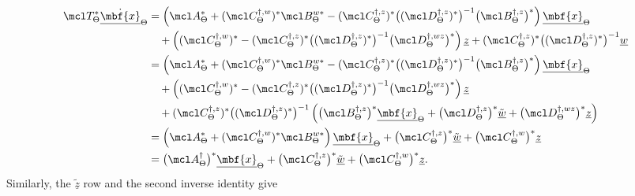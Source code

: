 \begin{align*}
\mcl T_\Theta^*\dot{\underline{\mbf{x}}}_\Theta
&=
\left(
\mcl A_\Theta^*+
(\mcl C_\Theta^{\dagger,w})^*\mcl B_\Theta^{w*}
-
(\mcl C_\Theta^{\dagger,z})^*
\bigl((\mcl D_\Theta^{\dagger,z})^*\bigr)^{-1}
\bigl(\mcl B_\Theta^{\dagger,z}\bigr)^*
\right)\underline{\mbf{x}}_\Theta\\
&\quad+
\left(
(\mcl C_\Theta^{\dagger,w})^*
-
(\mcl C_\Theta^{\dagger,z})^*
\bigl((\mcl D_\Theta^{\dagger,z})^*\bigr)^{-1}
\bigl(\mcl D_\Theta^{\dagger,wz}\bigr)^*
\right)\underline z
+
(\mcl C_\Theta^{\dagger,z})^*
\bigl((\mcl D_\Theta^{\dagger,z})^*\bigr)^{-1}
\underline w\\
&=
\left(
\mcl A_\Theta^*+
(\mcl C_\Theta^{\dagger,w})^*\mcl B_\Theta^{w*}
-
(\mcl C_\Theta^{\dagger,z})^*
\bigl((\mcl D_\Theta^{\dagger,z})^*\bigr)^{-1}
\bigl(\mcl B_\Theta^{\dagger,z}\bigr)^*
\right)\underline{\mbf{x}}_\Theta\\
&\quad+
\left(
(\mcl C_\Theta^{\dagger,w})^*
-
(\mcl C_\Theta^{\dagger,z})^*
\bigl((\mcl D_\Theta^{\dagger,z})^*\bigr)^{-1}
\bigl(\mcl D_\Theta^{\dagger,wz}\bigr)^*
\right)\underline z\\
&\quad{}+
(\mcl C_\Theta^{\dagger,z})^*
\bigl((\mcl D_\Theta^{\dagger,z})^*\bigr)^{-1}
\left(
\bigl(\mcl B_\Theta^{\dagger,z}\bigr)^*
\underline{\mbf{x}}_\Theta
+
\bigl(\mcl D_\Theta^{\dagger,z}\bigr)^*
\tilde{\underline w}
+
\bigl(\mcl D_\Theta^{\dagger,wz}\bigr)^*\underline z
\right)\\
&=
\left(
\mcl A_\Theta^*+
(\mcl C_\Theta^{\dagger,w})^*\mcl B_\Theta^{w*}
\right)\underline{\mbf{x}}_\Theta
+
\bigl(\mcl C_\Theta^{\dagger,z}\bigr)^*
\tilde{\underline w}
+
\bigl(\mcl C_\Theta^{\dagger,w}\bigr)^*
\underline z\\
&=
\bigl(\mcl A_\Theta^\dagger\bigr)^*
\underline{\mbf{x}}_\Theta
+
\bigl(\mcl C_\Theta^{\dagger,z}\bigr)^*
\tilde{\underline w}
+
\bigl(\mcl C_\Theta^{\dagger,w}\bigr)^*
\underline z .
\end{align*}
Similarly, the $\tilde{\underline z}$ row and the second inverse identity give
